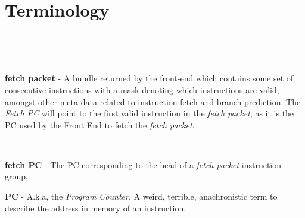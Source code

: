 \chapter{Terminology}



\

\


{\bf fetch packet} - A bundle returned by the front-end which contains some set of consecutive instructions with a mask denoting which instructions are valid, amongst other meta-data related to instruction fetch and branch prediction. The {\em Fetch PC} will point to the first valid instruction in the {\em fetch packet}, as it is the PC used by the Front End to fetch the {\em fetch packet}.

\

{\bf fetch PC} - The PC corresponding to the head of a {\em fetch packet} instruction group. 

{\bf PC} - A.k.a, the {\em Program Counter}.  A weird, terrible, anachronistic term to describe the address in memory of an instruction. 